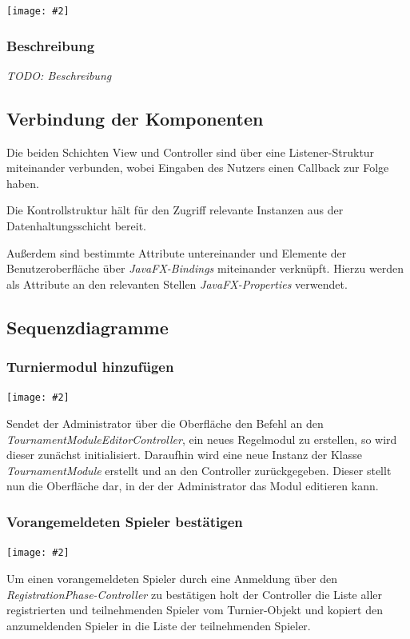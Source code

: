 \documentclass[11pt]{article}
\newcommand{\includediagram}[2]{
	\begin{center}
		\texttt{[image: \#2]}
	\end{center}
}
\begin{document}
\includediagram{1.0}{controller.png}

\subsubsection{Beschreibung}

\textit{TODO: Beschreibung}

\subsection{Verbindung der Komponenten}

Die beiden Schichten View und Controller sind über eine Listener-Struktur miteinander verbunden, wobei Eingaben des Nutzers einen Callback zur Folge haben.

Die Kontrollstruktur hält für den Zugriff relevante Instanzen aus der Datenhaltungsschicht bereit.

Außerdem sind bestimmte Attribute untereinander und Elemente der Benutzeroberfläche über \textit{JavaFX-Bindings} miteinander verknüpft. Hierzu werden als Attribute an den relevanten Stellen \textit{JavaFX-Properties} verwendet.

\subsection{Sequenzdiagramme}

\subsubsection{Turniermodul hinzufügen}

\includediagram{1.0}{sequence-add-tournament-module.png}

Sendet der Administrator über die Oberfläche den Befehl an den \textit{TournamentModuleEditorController}, ein neues Regelmodul zu erstellen, so wird dieser zunächst initialisiert. Daraufhin wird eine neue Instanz der Klasse \textit{TournamentModule} erstellt und an den Controller zurückgegeben. Dieser stellt nun die Oberfläche dar, in der der Administrator das Modul editieren kann.

\subsubsection{Vorangemeldeten Spieler bestätigen}

\includediagram{1.0}{sequence-verify-registered-player.png}

Um einen vorangemeldeten Spieler durch eine Anmeldung über den \textit{RegistrationPhase-Controller} zu bestätigen holt der Controller die Liste aller registrierten und teilnehmenden Spieler vom Turnier-Objekt und kopiert den anzumeldenden Spieler in die Liste der teilnehmenden Spieler.
\end{document}
